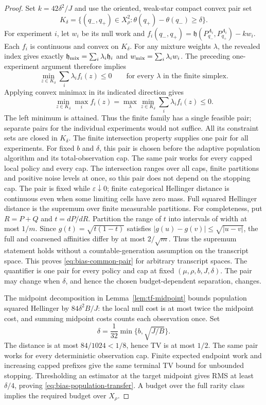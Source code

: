 \begin{proof}
Set $k=42\delta^2/J$ and use the oriented, weak-star compact convex pair set
\[
 K_\delta=\{(q_-,q_+)\in X_\rho^2:
                 \theta(q_+)-\theta(q_-)\ge\delta\}.
\]
For experiment $i$, let $w_i$ be its null work and
$f_i(q_-,q_+)=\mathfrak h(P_{q_-}^{A_i},P_{q_+}^{A_i})-kw_i$.
Each $f_i$ is continuous and convex on $K_\delta$.
For any mixture weights $\lambda$, the revealed index gives exactly
$\mathfrak h_{\rm mix}=\sum_i\lambda_i\mathfrak h_i$ and $w_{\rm mix}=\sum_i\lambda_iw_i$.
The preceding one-experiment argument therefore implies
\[
 \min_{z\in K_\delta}\sum_i\lambda_i f_i(z)\le0
 \qquad\text{for every }\lambda\text{ in the finite simplex}.
\]
Applying convex minimax in its indicated direction gives
\[
 \min_{z\in K_\delta}\max_i f_i(z)
 =\max_\lambda\min_{z\in K_\delta}\sum_i\lambda_i f_i(z)\le0.
\]
The left minimum is attained. Thus the finite family has a single feasible
pair; separate pairs for the individual experiments would not suffice.
All its constraint sets are closed in $K_\delta$.
The finite intersection property supplies one pair for all experiments.
For fixed $b$ and $\delta$, this pair is chosen before the adaptive
population algorithm and its total-observation cap. The same pair
works for every capped local policy and every cap.
The intersection ranges over all caps, finite partitions and positive
noise levels at once, so this pair does not depend on the stopping cap.
The pair is fixed while $\varepsilon\downarrow0$; finite categorical
Hellinger distance is continuous even when some limiting cells have zero
mass. Full squared Hellinger distance is the supremum over finite
measurable partitions. For completeness, put $R=P+Q$ and $t=dP/dR$.
Partition the range of $t$ into intervals of width at most $1/m$.
Since $g(t)=\sqrt{t(1-t)}$ satisfies $|g(u)-g(v)|\le\sqrt{|u-v|}$,
the full and coarsened affinities differ by at most $2/\sqrt m$.
Thus the supremum statement holds without a countable-generation
assumption on the transcript space. This proves
\eqref{eq:bias-common-pair} for arbitrary transcript spaces.
The quantifier is one pair for every policy and cap at fixed
$(\mu,\rho,b,J,\delta)$. The pair may change when $\delta$, and hence
the chosen budget-dependent separation, changes.

The midpoint decomposition in Lemma~\ref{lem:tf-midpoint}
bounds population squared Hellinger by
\(84\delta^2B/J\): the local null cost is at most twice the midpoint
cost, and summing midpoint costs counts each observation once.  Set
\[
 \delta=\frac1{32}\min\{b,\sqrt{J/B}\}.
\]
The distance is at most \(84/1024<1/8\), hence TV is at most \(1/2\).
The same pair works for every deterministic observation cap.  Finite
expected endpoint work and increasing capped prefixes give the same
terminal TV bound for unbounded stopping.  Thresholding an estimator at
the target midpoint gives RMS at least \(\delta/4\), proving
\eqref{eq:bias-population-transfer}.  A budget over the full rarity class
implies the required budget over \(X_\rho\).
\end{proof}

